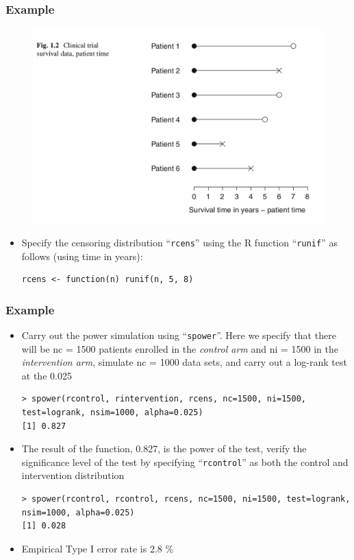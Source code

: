 \documentclass{beamer}
\newcommand{\empr}[1]{{\emph{\color{red}#1}}}
\begin{document}
\pagebreak
\begin{frame}[fragile]
\frametitle{Example}
\begin{figure}[h!]
	\includegraphics[scale = .5]{002.png}
\end{figure}
\begin{itemize}
\item  Specify the censoring distribution ``\texttt{rcens}'' using the R function ``\texttt{runif}'' as follows (using time in years):
\begin{Verbatim}
rcens <- function(n) runif(n, 5, 8)
\end{Verbatim}
\end{itemize}
\end{frame}

\pagebreak
\begin{frame}[fragile]
\frametitle{Example}
\begin{itemize}
\item Carry out the power simulation using ``\texttt{spower}''. Here we specify that there will be nc = 1500 patients enrolled in the \empr{control arm} and ni = 1500 in the \empr{intervention arm}, simulate nc = 1000 data sets, and carry out a log-rank test at the 0.025
\begin{Verbatim}
> spower(rcontrol, rintervention, rcens, nc=1500, ni=1500,
test=logrank, nsim=1000, alpha=0.025)
[1] 0.827
\end{Verbatim}
\item The result of the function, 0.827, is the power of the test, verify the significance level of the test by specifying ``\texttt{rcontrol}'' as both the control and intervention distribution
\begin{Verbatim}
> spower(rcontrol, rcontrol, rcens, nc=1500, ni=1500, test=logrank, nsim=1000, alpha=0.025)
[1] 0.028
\end{Verbatim}
\item Empirical Type I error rate is 2.8 \%
\end{itemize}
\end{frame}
\end{document}
